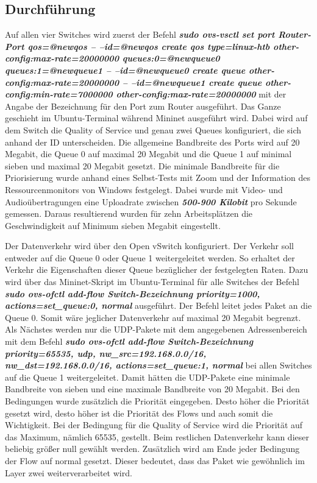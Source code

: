 \documentclass[fontsize=12pt,paper=a4,open=any,parskip=half,
  twoside=false,toc=listof,toc=bibliography,fleqn,leqno,
  captions=nooneline,captions=tableabove,british]{scrbook}
\begin{document}
\subsection{Durchführung}
Auf allen vier Switches wird zuerst der Befehl \textit{\textbf{sudo ovs-vsctl set port Router-Port qos=@newqos -- --id=@newqos create qos type=linux-htb other-config:max-rate=20000000 queues:0=@newqueue0 queues:1=@newqueue1 -- --id=@newqueue0 create queue other-config:max-rate=20000000 -- --id=@newqueue1 create queue other-config:min-rate=7000000 other-config:max-rate=20000000}} mit der Angabe der Bezeichnung für den Port zum Router ausgeführt. Das Ganze geschieht im Ubuntu-Terminal während Mininet ausgeführt wird. Dabei wird auf dem Switch die Quality of Service und genau zwei Queues konfiguriert, die sich anhand der ID unterscheiden. Die allgemeine Bandbreite des Ports wird auf 20 Megabit, die Queue 0 auf maximal 20 Megabit und die Queue 1 auf minimal sieben und maximal 20 Megabit gesetzt. Die minimale Bandbreite für die Priorisierung wurde anhand eines Selbst-Tests mit Zoom und der Information des Ressourcenmonitors von Windows festgelegt. Dabei wurde mit Video- und Audioübertragungen eine Uploadrate zwischen \textit{\textbf{500-900 Kilobit}} pro Sekunde gemessen. Daraus resultierend wurden für zehn Arbeitsplätzen die Geschwindigkeit auf Minimum sieben Megabit eingestellt.\par
Der Datenverkehr wird über den Open vSwitch konfiguriert. Der Verkehr soll entweder auf die Queue 0 oder Queue 1 weitergeleitet werden. So erhaltet der Verkehr die Eigenschaften dieser Queue bezüglicher der festgelegten Raten. Dazu wird über das Mininet-Skript im Ubuntu-Terminal für alle Switches der Befehl \textit{\textbf{sudo ovs-ofctl add-flow Switch-Bezeichnung priority=1000, actions=set\_queue:0, normal}} ausgeführt. Der Befehl leitet jedes Paket an die Queue 0. Somit wäre jeglicher Datenverkehr auf maximal 20 Megabit begrenzt. Als Nächstes werden nur die UDP-Pakete mit dem angegebenen Adressenbereich mit dem Befehl \textit{\textbf{sudo ovs-ofctl add-flow Switch-Bezeichnung priority=65535, udp, nw\_src=192.168.0.0/16, nw\_dst=192.168.0.0/16, actions=set\_queue:1, normal}} bei allen Switches auf die Queue 1 weitergeleitet. Damit hätten die UDP-Pakete eine minimale Bandbreite von sieben und eine maximale Bandbreite von 20 Megabit. Bei den Bedingungen wurde zusätzlich die Priorität eingegeben. Desto höher die Priorität gesetzt wird, desto höher ist die Priorität des Flows und auch somit die Wichtigkeit. Bei der Bedingung für die Quality of Service wird die Priorität auf das Maximum, nämlich 65535, gestellt. Beim restlichen Datenverkehr kann dieser beliebig größer null gewählt werden. Zusätzlich wird am Ende jeder Bedingung der Flow auf normal gesetzt. Dieser bedeutet, dass das Paket wie gewöhnlich im Layer zwei weiterverarbeitet wird.
\end{document}
